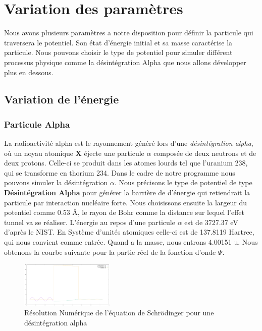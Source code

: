 \section{Variation des paramètres}
\par Nous avons plusieurs paramètres a notre disposition pour définir la particule qui traversera le potentiel. Son état d'énergie initial et sa masse caractérise la particule. Nous pouvons choisir le type de potentiel pour simuler différent processus physique comme la désintégration Alpha que nous allons développer plus en dessous. 

\subsection{Variation de l’énergie}

\subsubsection{Particule Alpha}

 \par La radioactivité alpha est le rayonnement généré lors d'une \textit{désintégration alpha}, où un noyau atomique \textbf{X} éjecte une particule $\alpha$ composée de deux neutrons et de deux protons. Celle-ci se produit dans les atomes lourds tel que l'uranium 238, qui se transforme en thorium 234\cite{frwiki:200073754}. Dans le cadre de notre programme nous pouvons simuler la désintégration $\alpha$. Nous précisons le type de potentiel de type \textbf{Désintégration Alpha} pour générer la barrière de d'énergie qui retiendrait la particule par interaction nucléaire forte. Nous choisissons ensuite la largeur du potentiel comme 0.53 \si{\angstrom}, le rayon de Bohr comme la distance sur lequel l'effet tunnel va se réaliser. L'énergie au repos d'une particule $\alpha$ est de 3727.37 eV d'après le NIST\cite{enwiki:1148882523}. En Système d'unités atomiques celle-ci est de 137.8119 Hartree, qui nous convient comme entrée. Quand a la masse, nous entrons 4.00151 u\cite{NIST1}. Nous obtenons la courbe suivante pour la partie réel de la fonction d'onde $\Psi$.

 \begin{figure}[!ht]
     \centering
     \includegraphics[width=0.4\textwidth]{Alpha/AlphaParticleDesintegration.pdf}
     \caption{Résolution Numérique de l'équation de Schrödinger pour une désintégration alpha}
     \label{fig:my_label}
 \end{figure}

